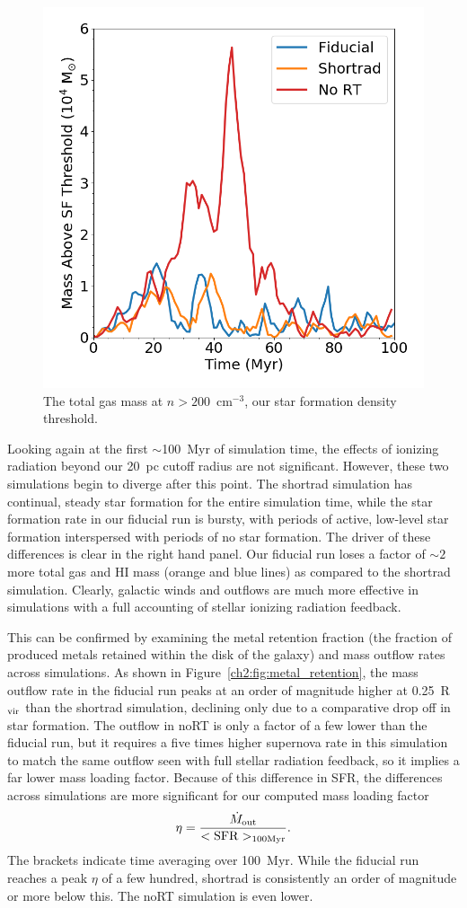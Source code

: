 \begin{figure}
\centering
\includegraphics[width=0.65\linewidth]{figures/ch2/mass_density_cut}
\caption{The total gas mass at $n > 200$~cm$^{-3}$, our star formation density threshold.}
\label{ch2:fig:sf gas}
\end{figure}

Looking again at the first $\sim$100~Myr of simulation time, the effects of ionizing radiation beyond our 20~pc cutoff radius are not significant. However, these two simulations begin to diverge after this point. The shortrad simulation has continual, steady star formation for the entire simulation time, while the star formation rate in our fiducial run is bursty, with periods of active, low-level star formation interspersed with periods of no star formation. The driver of these differences is clear in the right hand panel. Our fiducial run loses a factor of $\sim 2$ more total gas and HI mass (orange and blue lines) as compared to the shortrad simulation. Clearly, galactic winds and outflows are much more effective in simulations with a full accounting of stellar ionizing radiation feedback.

This can be confirmed by examining the metal retention fraction (the fraction of produced metals retained within the disk of the galaxy) and mass outflow rates across simulations. As shown in Figure~\ref{ch2:fig:metal_retention}, the mass outflow rate in the fiducial run peaks at an order of magnitude higher at 0.25~R$_{\rm vir}$ than the shortrad simulation, declining only due to a comparative drop off in star formation. The outflow in noRT is only a factor of a few lower than the fiducial run, but it requires a five times higher supernova rate in this simulation to match the same outflow seen with full stellar radiation feedback, so it implies a far lower mass loading factor. Because of this difference in SFR,
the differences across simulations are more significant for our computed mass loading factor
\begin{equation}
    \eta = \frac{ \dot{M}_{\rm out}}{ <\rm{SFR}>_{100 \rm{Myr}}}.
\end{equation} The brackets indicate time averaging over 100~Myr.
%
While the fiducial run reaches a peak $\eta$ of a few hundred, shortrad is consistently an order of magnitude or more below this. The noRT simulation is even lower.

